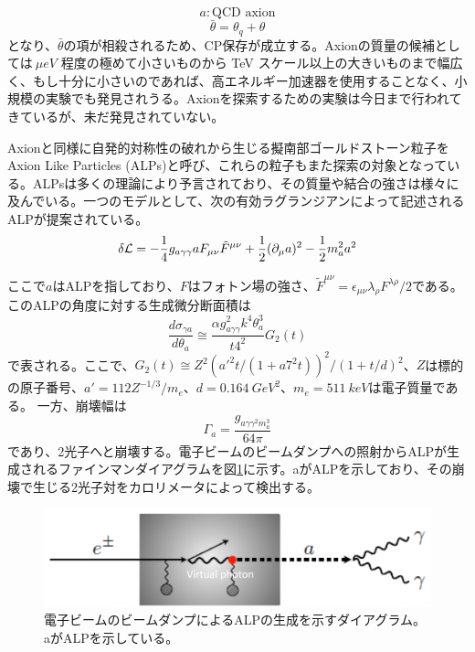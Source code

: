 \[
a : \textrm{QCD axion}
\]
\[
\bar{\theta} = \theta_q + \theta
\]
となり、$\bar{\theta}$の項が相殺されるため、CP保存が成立する。Axionの質量の候補としては$\SI{}{\mu eV}$ 程度の極めて小さいものから TeV スケール以上の大きいものまで幅広く、もし十分に小さいのであれば、高エネルギー加速器を使用することなく、小規模の実験でも発見されうる。Axionを探索するための実験は今日まで行われてきているが、未だ発見されていない。

Axionと同様に自発的対称性の破れから生じる擬南部ゴールドストーン粒子をAxion Like Particles (ALPs)と呼び、これらの粒子もまた探索の対象となっている。ALPsは多くの理論により予言されており、その質量や結合の強さは様々に及んでいる。一つのモデルとして、次の有効ラグランジアンによって記述されるALPが提案されている。
\begin{equation}
\delta{\cal L} =-\frac{1}{4}g_{a\gamma\gamma}aF_{\mu\nu}\tilde{F}^{\mu\nu}+\frac{1}{2}(\partial_{\mu}a)^2-\frac{1}{2}m_a^2a^2
\end{equation}

ここで$a$はALPを指しており、$F$はフォトン場の強さ、$\tilde{F}^{\mu\nu}=\epsilon_{\mu\nu}\lambda_\rho F^{\lambda\rho}/2$である。
このALPの角度に対する生成微分断面積は
\begin{equation}
\frac{d\sigma_{\gamma a}}{d\theta_a} \cong \frac{\alpha g^2_{a\gamma\gamma}k^4\theta_a^3}{t4^2} G_2(t)
\end{equation}
で表される。ここで、$G_2(t)\cong Z^2(a'^2t/(1+a7^2t))^2/(1+t/d)^2$、$Z$は標的の原子番号、$a'=112Z^{-1/3}/m_e$、$d=\SI{0.164}{GeV^2}$、$m_e=\SI{511}{keV}$は電子質量である。
一方、崩壊幅は
\begin{equation}
\Gamma_a = \frac{g_{a\gamma\gamma^2 m_a^3}}{64\pi}
\end{equation}
であり、2光子へと崩壊する。電子ビームのビームダンプへの照射からALPが生成されるファインマンダイアグラムを図\ref{ALP_int}に示す。aがALPを示しており、その崩壊で生じる2光子対をカロリメータによって検出する。

\begin{figure}[h]
	\begin{center}
		\includegraphics[width=350pt]{./Figure/Introduction/ALP_int.png}
		\caption[ビームダンプによるALPの生成を示すファインマンダイアグラム]{電子ビームのビームダンプによるALPの生成を示すダイアグラム。aがALPを示している。}
		\label{ALP_int}
	\end{center}
\end{figure}


